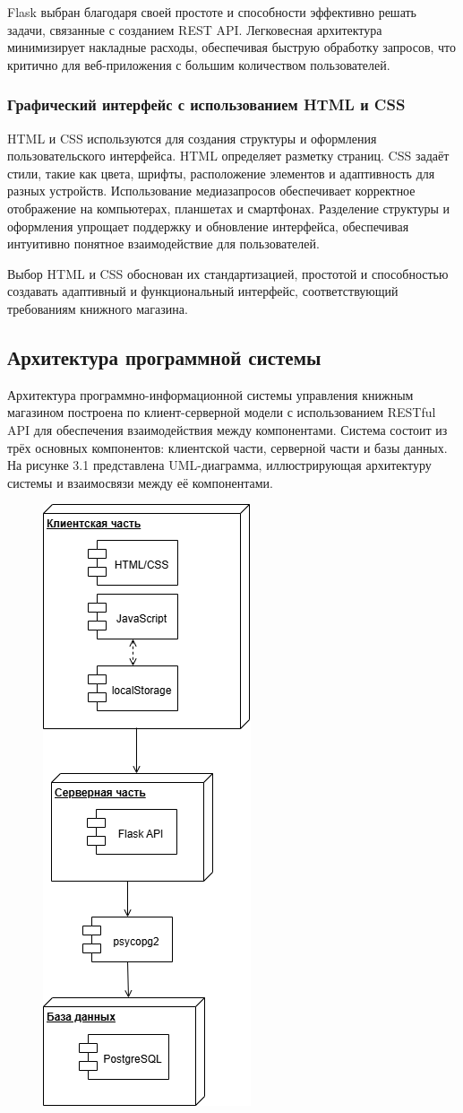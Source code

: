 Flask выбран благодаря своей простоте и способности эффективно решать задачи, связанные с созданием REST API. Легковесная архитектура минимизирует накладные расходы, обеспечивая быструю обработку запросов, что критично для веб-приложения с большим количеством пользователей.

\subsubsection{Графический интерфейс с использованием HTML и CSS}

HTML и CSS используются для создания структуры и оформления пользовательского интерфейса. HTML определяет разметку страниц. CSS задаёт стили, такие как цвета, шрифты, расположение элементов и адаптивность для разных устройств. Использование медиазапросов обеспечивает корректное отображение на компьютерах, планшетах и смартфонах. Разделение структуры и оформления упрощает поддержку и обновление интерфейса, обеспечивая интуитивно понятное взаимодействие для пользователей.

Выбор HTML и CSS обоснован их стандартизацией, простотой и способностью создавать адаптивный и функциональный интерфейс, соответствующий требованиям книжного магазина.

\subsection{Архитектура программной системы}

 Архитектура программно-информационной системы управления книжным магазином построена по клиент-серверной модели с использованием RESTful API для обеспечения взаимодействия между компонентами. Система состоит из трёх основных компонентов: клиентской части, серверной части и базы данных. На рисунке 3.1 представлена UML-диаграмма, иллюстрирующая архитектуру системы и взаимосвязи между её компонентами.

\begin{figure}[H]
	\centering
	\includegraphics[width=0.3\linewidth]{images/диаграмма_компонентов}
	\caption{}
	\label{fig:}
\end{figure}


